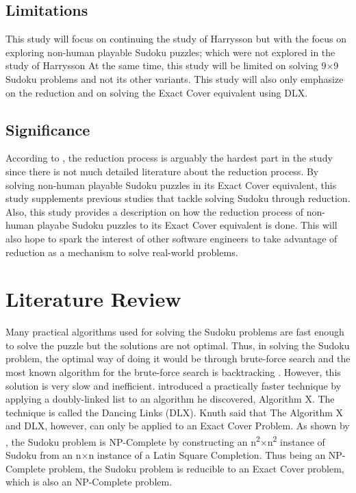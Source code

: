 \documentclass[a4paper,oneside,11pt]{report}
\begin{document}
\section{Limitations}
This study will focus on continuing the study of Harrysson but with the focus on exploring non-human playable Sudoku puzzles; which were not explored in the study of Harrysson At the same time, this study will be limited on solving 9$\times$9 Sudoku problems and not its other variants. This study will also only emphasize on the reduction and on solving the Exact Cover equivalent using DLX.

\section{Significance}
According to \cite{Harrysson}, the reduction process is arguably the hardest part in the study since there is not much detailed literature about the reduction process. By solving non-human playable Sudoku puzzles in its Exact Cover equivalent, this study supplements previous studies that tackle solving Sudoku through reduction. Also, this study provides a description on how the reduction process  of non-human playabe Sudoku puzzles to its Exact Cover equivalent is done. This will also hope to spark the interest of other software engineers to take advantage of reduction as a mechanism to solve real-world problems.

\chapter{Literature Review}
Many practical algorithms used for solving the Sudoku problems are fast enough to solve the puzzle but the solutions are not optimal. Thus, in solving the Sudoku problem, the optimal way of doing it would be through brute-force search and the most known algorithm for the brute-force search is backtracking \cite{Cazenave}. However, this solution is very slow and inefficient. \cite{Knuth} introduced a practically faster technique by applying a doubly-linked list to an algorithm he discovered, Algorithm X. The technique is called the Dancing Links (DLX). Knuth said that The Algorithm X and DLX, however, can only be applied to an Exact Cover Problem. As shown by \cite{Yato}, the Sudoku problem is NP-Complete by constructing an n\textsuperscript{2}$\times$n\textsuperscript{2} instance of Sudoku from an n$\times$n instance of a Latin Square Completion. Thus being an NP-Complete problem, the Sudoku problem is reducible to an Exact Cover problem, which is also an NP-Complete problem.\\
\end{document}

